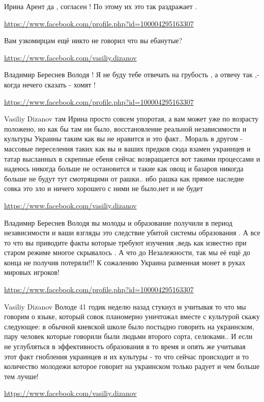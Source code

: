 \documentclass[a4paper,11pt]{extreport}
\begin{document}
\begin{itemize}
\begin{itemize}
Ирина Арент да , согласен ! По этому их это так раздражает .

\url{https://www.facebook.com/profile.php?id=100004295163307}

Вам узкомирцам ещё никто не говорил что вы ебанутые? 🤦

\url{https://www.facebook.com/vasiliy.dizanov}

Владимир Береснев Володя ! Я не буду тебе отвечать на грубость , а отвечу так ,- когда нечего сказать - хомят !

\url{https://www.facebook.com/profile.php?id=100004295163307}

Vasiliy Dizanov там Ирина просто совсем упоротая, а вам может уже по возрасту положено, но как бы там ни было, восстановление реальной независимости и культуры Украины таким как вы не нравится и это факт..
Мораль в другом - массовые переселения таких как вы и ваших предков сюда взамен украинцев и татар высланных в скрепные ебеня сейчас возвращается вот такими процессами и надеюсь никогда больше не остановится и такие как овощ и базаров никогда больше не будут тут смотрящими от рашки.. ибо рашка как прямое наследие совка это зло и ничего хорошего с ними не было,нет и не будет

\url{https://www.facebook.com/vasiliy.dizanov}

Владимир Береснев Володя вы молоды и образование получили в период независимости и ваши взгляды это следствие убитой системы образования . А все то что вы приводите факты которые требуют изучения ,ведь как известно при старом режиме многое скрывалось . А что до Незалежности, так мы её ещё до конца не получив потеряли!!! К сожалению Украина разменная монет в руках мировых игроков!

\url{https://www.facebook.com/profile.php?id=100004295163307}

Vasiliy Dizanov Володе 41 годик неделю назад стукнул и учитывая то что мы говорим о языке, который совок планомерно уничтожал вместе с культурой скажу следующее: в обычной киевской школе было постыдно говорить на украинском, пару человек которые говорили были людьми второго сорта, селюками..
И если не углубляться в эффективность образования в то время и опять же учитывая этот факт гнобления украинцев и их культуры - то что сейчас происходит и то количество молодежи которое говорит на украинском только радует и чем больше тем лучше!

\url{https://www.facebook.com/vasiliy.dizanov}


\end{itemize}
\end{itemize}
\end{document}
